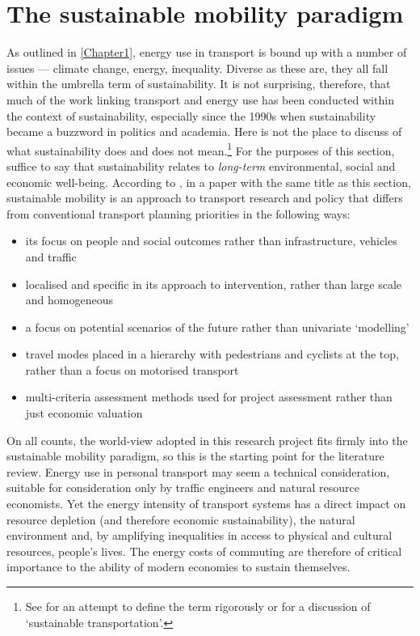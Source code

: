 \section{The sustainable mobility paradigm} \label{ssus}
As outlined in \cref{Chapter1}, energy use in transport is bound up with a
number of issues --- climate change, energy, inequality.
Diverse as these are, they all fall within
the umbrella term of sustainability. It is not surprising, therefore, that much
of the work linking transport and energy use has been conducted within the context of
sustainability, especially since the 1990s when sustainability became a buzzword
in politics and academia. Here is not the place to discuss
of what sustainability does and does not mean.\footnote{See \citep{Pezzey1997} for an
attempt to define the term rigorously or \citep{Steg2005} for a discussion
of `sustainable transportation'.
}
For the purposes of this section, suffice to
say that sustainability relates to \emph{long-term} environmental, social and
economic well-being. According to \citet{Banister2008}, in a paper with the
same title as this section, sustainable mobility is an approach to transport
research and policy that differs from conventional transport planning priorities
in the following ways:
\begin{itemize}
 \item its focus on people and social outcomes rather than infrastructure,
 vehicles and traffic
 \item localised and specific in its approach to intervention, rather than large
 scale and homogeneous
 \item a focus on potential scenarios of the future rather than univariate `modelling'
 \item travel modes placed in a hierarchy with pedestrians and cyclists at the top,
 rather than a focus on motorised transport
 \item multi-criteria assessment methods used for project assessment
 rather than just economic valuation
\end{itemize}
On all counts, the world-view adopted in this research project
fits firmly into the sustainable mobility
paradigm, so this is the starting point for the literature review. Energy use
in personal transport may seem a technical consideration, suitable for consideration
only by traffic engineers and natural resource economists. Yet the energy intensity
of transport systems has a direct impact on resource depletion (and therefore
economic sustainability), the natural environment and, by amplifying inequalities
in access to physical and cultural resources, people's lives.
The energy costs of commuting are therefore of critical importance to
the ability of modern economies to sustain themselves.

